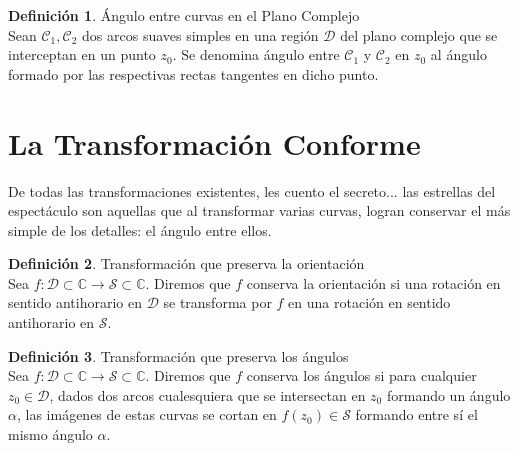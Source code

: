 \documentclass[12pt]{article}
\theoremstyle{definition}
\newtheorem{definition}{Definici\'on}[section]
\theoremstyle{theorem}
\theoremstyle{corolary}
\begin{document}
\colorbox{orange!40!white!80}{\parbox{\linewidth}{
 \theoremstyle{definition}
 \begin{definition}{\'Angulo entre curvas en el Plano Complejo}\\
  	Sean $\mathcal{C}_1, \mathcal{C}_2$ dos arcos suaves simples en una regi\'on $\mathcal{D} $ del plano complejo que se interceptan en un punto $z_0$. Se denomina \'angulo entre $\mathcal{C}_1$ y $\mathcal{C}_2$ en $z_0$ al \'angulo formado por las respectivas rectas tangentes en dicho punto.
  	
 \end{definition}}}
\linebreak
\linebreak


\section{La Transformaci\'on Conforme}
De todas las transformaciones existentes, les cuento el secreto... las estrellas del espect\'aculo son aquellas que al transformar varias curvas, logran conservar el m\'as simple de los detalles: el \'angulo entre ellos.\\


\colorbox{red!40!white!80}{\parbox{\linewidth}{
 \theoremstyle{definition}
 \begin{definition}{Transformaci\'on que preserva la orientaci\'on}\\
  	Sea $f: \mathcal{D} \subset \mathbb{C} \rightarrow \mathcal{S}\subset \mathbb{C}$. Diremos que $f$ conserva la orientaci\'on si una rotaci\'on en sentido antihorario en $\mathcal{D}$ se transforma por $f$ en una rotaci\'on en sentido antihorario en $\mathcal{S}$.

 \end{definition}}}
\linebreak
\linebreak

\colorbox{red!40!white!80}{\parbox{\linewidth}{
 \theoremstyle{definition}
 \begin{definition}{Transformaci\'on que preserva los \'angulos}\\
  	Sea $f: \mathcal{D} \subset \mathbb{C} \rightarrow \mathcal{S}\subset \mathbb{C}$. Diremos que $f$ conserva los \'angulos si para cualquier $z_0 \in \mathcal{D}$, dados dos arcos cualesquiera que se intersectan en $z_0$ formando un \'angulo $\alpha$, las im\'agenes de estas curvas se cortan en $f(z_0) \in \mathcal{S}$ formando entre s\'i el mismo \'angulo $\alpha$.

 \end{definition}}}
\linebreak
\linebreak
\end{document}
